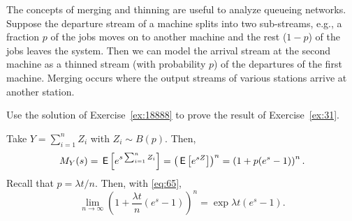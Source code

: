 The concepts of merging and thinning are useful to analyze queueing networks.
Suppose the departure stream of a machine splits into two sub-streams, e.g., a fraction $p$ of the jobs moves on to another machine and the rest ($1-p$) of the jobs leaves the system.
Then we can model the arrival stream at the second machine as a thinned stream (with probability $p$) of the departures of the first machine.
Merging occurs where the output streams of various stations arrive at another station.

\begin{extra}
Use the solution of Exercise~\ref{ex:18888} to prove the result of Exercise~\ref{ex:31}. 
\begin{solution}
Take $Y=\sum_{i=1}^n Z_i$ with $Z_i\sim B(p)$. Then, 
\begin{equation*}
M_Y(s) = \,\mathsf{E}\left[e^{s\sum_{i=1}^n Z_i}\right] = \left(\,\mathsf{E}\left[e^{s Z}\right]\right)^n = \left(1 + p (e^s - 1)\right)^n. 
\end{equation*}
Recall that $p= \lambda t/ n$. Then, with \eqref{eq:65},
\begin{equation*}
\lim_{n\to\infty}  \left(1 + \frac{\lambda t}{n} (e^s - 1)\right)^n = \exp{\lambda t (e^s-1)}. 
\end{equation*}

\end{solution}

\end{extra}





